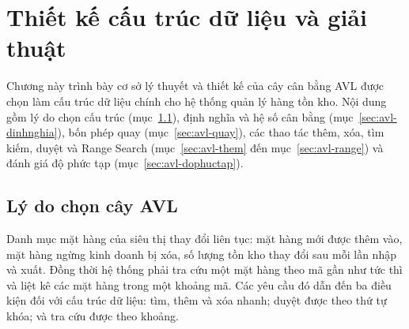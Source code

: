 %

\newcommand{\tamgiac}[3]{%
  \coordinate (#1) at (#2);
  \draw[fill=gray!15] (#1) -- ++(-0.5,-0.9) -- ++(1,0) -- cycle;
  \node[font=\scriptsize] at ([yshift=-0.62cm]#1) {#3};}

\chapter{Thiết kế cấu trúc dữ liệu và giải thuật}

Chương này trình bày cơ sở lý thuyết và thiết kế của cây cân bằng AVL được chọn
làm cấu trúc dữ liệu chính cho hệ thống quản lý hàng tồn kho. Nội dung gồm lý do
chọn cấu trúc (mục~\ref{sec:avl-lydo}), định nghĩa và hệ số cân bằng
(mục~\ref{sec:avl-dinhnghia}), bốn phép quay (mục~\ref{sec:avl-quay}), các thao
tác thêm, xóa, tìm kiếm, duyệt và Range Search (mục~\ref{sec:avl-them}
đến mục~\ref{sec:avl-range}) và đánh giá độ phức tạp (mục~\ref{sec:avl-dophuctap}).

\section{Lý do chọn cây AVL}\label{sec:avl-lydo}

Danh mục mặt hàng của siêu thị thay đổi liên tục: mặt hàng mới được thêm vào,
mặt hàng ngừng kinh doanh bị xóa, số lượng tồn kho thay đổi sau mỗi lần nhập và
xuất. Đồng thời hệ thống phải tra cứu một mặt hàng theo mã gần như tức thì và
liệt kê các mặt hàng trong một khoảng mã. Các yêu cầu đó dẫn đến ba điều kiện
đối với cấu trúc dữ liệu: tìm, thêm và xóa nhanh; duyệt được theo thứ tự khóa;
và tra cứu được theo khoảng.

